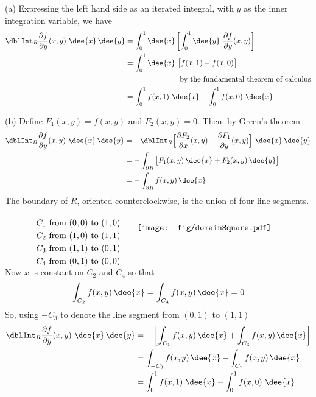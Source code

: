 \begin{solution} (a)
Expressing the left hand side as an iterated integral,
with $y$ as the inner integration variable, we have
\begin{align*}
\dblInt_R\frac{\partial f}{\partial y}(x,y)\ \dee{x}\,\dee{y}
&=\int_0^1\dee{x}\left[\int_0^1\dee{y}\
                \frac{\partial f}{\partial y}(x,y)\right] \\
&=\int_0^1\dee{x}\ \big[f(x,1)-f(x,0)\big] \\
&\hskip1in\text{by the fundamental theorem of calculus} \\
&=\int_0^1 f(x,1)\ \dee{x} - \int_0^1 f(x,0)\ \dee{x}
\end{align*}


(b)
Define $F_1(x,y)=f(x,y)$ and $F_2(x,y)=0$. Then. by Green's theorem
\begin{align*}
\dblInt_R\frac{\partial f}{\partial y}(x,y)\ \dee{x}\,\dee{y}
&=-\dblInt_R\Big[\frac{\partial F_2}{\partial x}(x,y)
                -\frac{\partial F_1}{\partial y}(x,y)\Big]\ \dee{x}\,\dee{y} \\
&=-\int_{\partial R}\big[F_1(x,y)\,\dee{x} +F_2(x,y)\,\dee{y}\big] \\
&=-\int_{\partial R}f(x,y)\,\dee{x}
\end{align*}
The boundary of $R$, oriented counterclockwise, is the union of four
line segments.
\begin{align*}
\\[-0.1in]
&\text{$C_1$ from $(0,0)$ to $(1,0)$}
\qquad\smash{\raisebox{-0.8\height}{\texttt{[image: fig/domainSquare.pdf]}}}\\
&\text{$C_2$ from $(1,0)$ to $(1,1)$} \\
&\text{$C_3$ from $(1,1)$ to $(0,1)$} \\
&\text{$C_4$ from $(0,1)$ to $(0,0)$}
\\[-0.1in]
\end{align*}
Now $x$ is constant on $C_2$ and $C_4$ so that
\begin{equation*}
\int_{C_2}f(x,y)\,\dee{x} = \int_{C_4}f(x,y)\,\dee{x} =0
\end{equation*}
So, using $-C_3$ to denote the line segment from $(0,1)$ to $(1,1)$
\begin{align*}
\dblInt_R\frac{\partial f}{\partial y}(x,y)\ \dee{x}\,\dee{y}
&=-\left[\int_{C_1}f(x,y)\,\dee{x}+\int_{C_3}f(x,y)\,\dee{x}\right]\\
&=\int_{-C_3}f(x,y)\,\dee{x}-\int_{C_1}f(x,y)\,\dee{x} \\
&=\int_0^1 f(x,1)\ \dee{x}  - \int_0^1 f(x,0)\ \dee{x}
\end{align*}

\end{solution}

